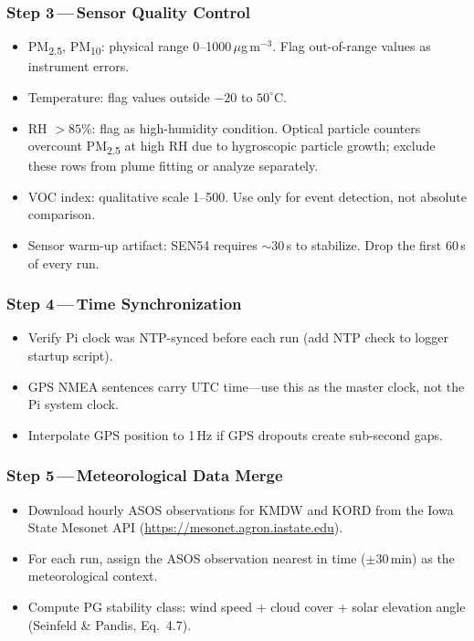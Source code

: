 \documentclass[11pt, letterpaper]{article}
\begin{document}
\subsubsection{Step 3\,---\,Sensor Quality Control}
\begin{itemize}
  \item PM\textsubscript{2.5}, PM\textsubscript{10}: physical range 0--1000\,$\mu$g\,m$^{-3}$. Flag out-of-range values as instrument errors.
  \item Temperature: flag values outside $-20$ to $50^\circ$C.
  \item RH $>85\%$: flag as high-humidity condition. Optical particle counters overcount PM\textsubscript{2.5} at high RH due to hygroscopic particle growth; exclude these rows from plume fitting or analyze separately.
  \item VOC index: qualitative scale 1--500. Use only for event detection, not absolute comparison.
  \item Sensor warm-up artifact: SEN54 requires $\sim$30\,s to stabilize. Drop the first 60\,s of every run.
\end{itemize}

\subsubsection{Step 4\,---\,Time Synchronization}
\begin{itemize}
  \item Verify Pi clock was NTP-synced before each run (add NTP check to logger startup script).
  \item GPS NMEA sentences carry UTC time---use this as the master clock, not the Pi system clock.
  \item Interpolate GPS position to 1\,Hz if GPS dropouts create sub-second gaps.
\end{itemize}

\subsubsection{Step 5\,---\,Meteorological Data Merge}
\begin{itemize}
  \item Download hourly ASOS observations for KMDW and KORD from the Iowa State Mesonet API (\url{https://mesonet.agron.iastate.edu}).
  \item For each run, assign the ASOS observation nearest in time ($\pm 30$\,min) as the meteorological context.
  \item Compute PG stability class: wind speed + cloud cover + solar elevation angle (Seinfeld \& Pandis, Eq.~4.7).
\end{itemize}
\end{document}
